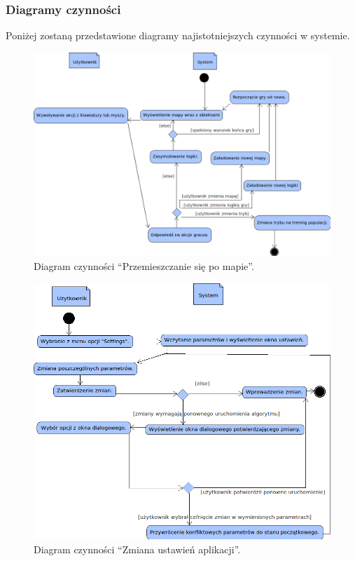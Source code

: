 \subsubsection{Diagramy czynności}
\begin{par}
		Poniżej zostaną przedstawione diagramy najistotniejszych czynności w systemie.
		\begin{figure}[!h]
		\centering
		\includegraphics[width=\textwidth]{obrazki/activity_diagram.png}
		\caption{Diagram czynności ``Przemieszczanie się po mapie''.}
		\label{fig:activ1}
		\end{figure}
		\begin{figure}[!h]
		\centering
		\includegraphics[width=\textwidth]{obrazki/activity_diagram_2.png}
		\caption{Diagram czynności ``Zmiana ustawień aplikacji''.}
		\label{fig:activ2}
		\end{figure}
		\FloatBarrier
\end{par}
